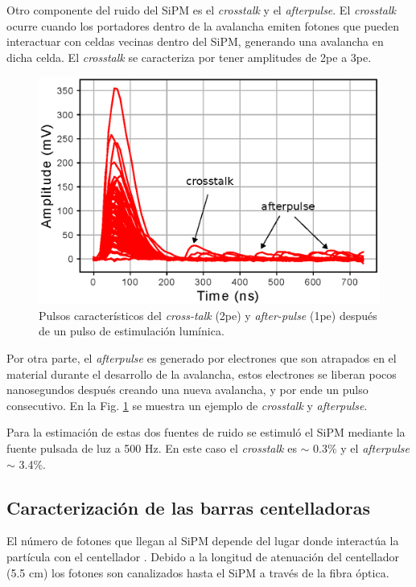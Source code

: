 Otro componente del ruido del SiPM es el \textit{crosstalk} y el \textit{afterpulse}. El \textit{crosstalk} ocurre cuando los portadores dentro de la avalancha emiten fotones que pueden interactuar con celdas vecinas dentro del SiPM, generando una avalancha en dicha celda. El \textit{crosstalk} se caracteriza por tener amplitudes de 2pe a 3pe.

\begin{figure}[h!]
\centering
\includegraphics[scale=0.75]{Figures/After}
\caption{Pulsos característicos del \textit{cross-talk} (2pe) y \textit{after-pulse} (1pe) después de un pulso de estimulación lumínica. }
\label{cross}
\end{figure}

Por otra parte, el \textit{afterpulse} es generado por electrones que son atrapados en el material durante el desarrollo de la avalancha, estos electrones se liberan pocos nanosegundos después creando una nueva avalancha, y por ende un pulso consecutivo. En la Fig. \ref{cross} se muestra un ejemplo de \textit{crosstalk} y \textit{afterpulse}.

Para la estimación de estas dos fuentes de ruido se estimuló el SiPM mediante la fuente pulsada de luz a 500 Hz. En este caso el \textit{crosstalk} es $\sim$ 0.3$\%$ y el \textit{afterpulse} $\sim$ 3.4$\%$.

\subsection{Caracterización de las barras centelladoras}

El número de fotones que llegan al SiPM depende del lugar donde interactúa la partícula con el centellador \cite{Calderon2019}. Debido a la longitud de atenuación del centellador (5.5 cm) los fotones son canalizados hasta el SiPM a través de la fibra óptica.

